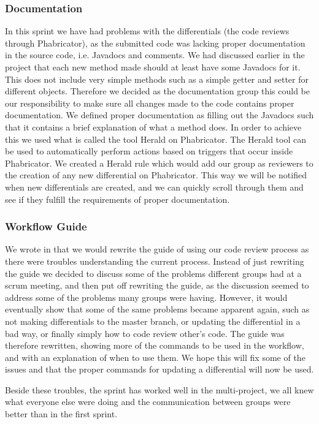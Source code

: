 \subsubsection{Documentation}
In this sprint we have had problems with the differentials (the code reviews through Phabricator), as the submitted code was lacking proper documentation in the source code, i.e. Javadocs and comments. 
We had discussed earlier in the project that each new method made should at least have some Javadocs for it.
This does not include very simple methods such as a simple getter and setter for different objects.
Therefore we decided as the documentation group this could be our responsibility to make sure all changes made to the code contains proper documentation.
We defined proper documentation as filling out the Javadocs such that it contains a brief explanation of what a method does.
In order to achieve this we used what is called the tool Herald on Phabricator.
The Herald tool can be used to automatically perform actions based on triggers that occur inside Phabricator.
We created a Herald rule which would add our group as reviewers to the creation of any new differential on Phabricator.
This way we will be notified when new differentials are created, and we can quickly scroll through them and see if they fulfill the requirements of proper documentation.

\subsubsection{Workflow Guide}
We wrote in  that we would rewrite the guide of using our code review process as there were troubles understanding the current process.
Instead of just rewriting the guide we decided to discuss some of the problems different groups had at a scrum meeting, and then put off rewriting the guide, as the discussion seemed to address some of the problems many groups were having.
However, it would eventually show that some of the same problems became apparent again, such as not making differentials to the master branch, or updating the differential in a bad way, or finally simply how to code review other's code.
The guide was therefore rewritten, showing more of the commands to be used in the workflow, and with an explanation of when to use them.
We hope this will fix some of the issues and that the proper commands for updating a differential will now be used.

Beside these troubles, the sprint has worked well in the multi-project, we all knew what everyone else were doing and the communication between groups were better than in the first sprint.

